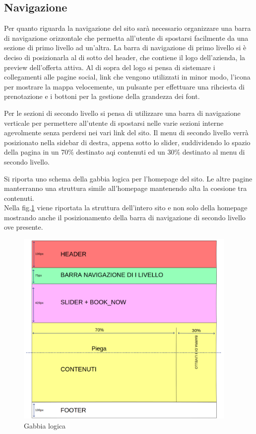 \documentclass[a4paper,12pt,hidelinks]{report}
\begin{document}
  \subsection{Navigazione}
  Per quanto riguarda la navigazione del sito sarà necessario organizzare una barra di navigazione orizzontale che permetta all'utente di spostarsi facilmente da una sezione di primo livello
  ad un'altra. La barra di navigazione di primo livello si è deciso di posizionarla al di sotto del header, che contiene il logo dell'azienda, la preview dell'offerta attiva. Al di sopra del logo
  si pensa di sistemare i collegamenti alle pagine social, link che vengono utilizzati in minor modo, l'icona per mostrare la mappa velocemente, un pulsante per effettuare una rihciesta di prenotazione
  e i bottoni per la gestione della grandezza dei font.
  \par Per le sezioni di secondo livello si pensa di utilizzare una barra di navigazione verticale per permettere all'utente di spostarsi nelle varie sezioni interne agevolmente senza
  perdersi nei vari link del sito. Il menu di secondo livello verrà posizionato nella sidebar di destra, appena sotto lo slider, suddividendo lo spazio della pagina in un 70\% destinato aqi contenuti
  ed un 30\% destinato al menu di secondo livello.
  \par Si riporta uno schema della gabbia logica per l'homepage del sito. Le altre pagine manterranno una struttura simile all'homepage mantenendo alta la coesione tra contenuti.
  \\Nella fig.\ref{fig:gabbiaLogica} viene riportata la struttura dell'intero sito e non solo della homepage mostrando anche il posizionamento della barra di navigazione di secondo livello ove presente.
  \begin{figure}[h!]%
    \includegraphics[width=0.95\textwidth,keepaspectratio=true]{img/gabbiaLogica}
    \centering
    \caption{Gabbia logica}%
    \label{fig:gabbiaLogica}%
  \end{figure}
  \newpage
\end{document}
